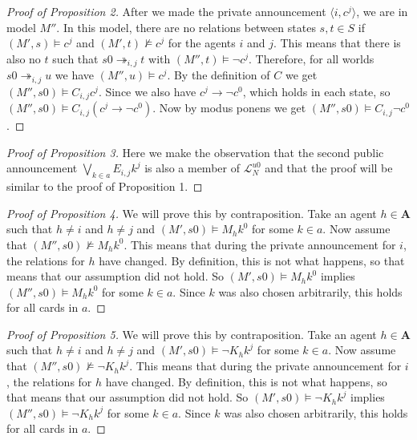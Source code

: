 \documentclass[a4paper, 10pt]{article}
\newcommand{\impl}{\rightarrow}
\newcommand{\A}{\mathbf{A}}
\begin{document}
\begin{proof}[Proof of Proposition 2]
    After we made the private announcement $\langle i, c^j\rangle$, we are
    in model $M''$. In this model, there are no relations between states
    $s, t \in S$ if $(M', s) \models c^j$ and $(M', t) \not \models c^j$
    for the agents $i$ and $j$. This means that there is also no $t$ such
    that $s0 \twoheadrightarrow_{i,j} t$ with $(M'', t) \models \neg c^j$.
    Therefore, for all worlds $s0 \twoheadrightarrow_{i,j} u$ we have
    $(M'', u) \models c^j$. By the definition of $C$ we get $(M'', s0)
    \models C_{i,j} c^j$. Since we also have $c^j \impl \neg c^0$, which
    holds in each state, so $(M'', s0) \models C_{i,j} (c^j \impl \neg
    c^0)$. Now by modus ponens we get $(M'', s0) \models C_{i,j} \neg c^0$.
\end{proof}

\begin{proof}[Proof of Proposition 3]
    Here we make the observation that the second public announcement
    $\bigvee_{k\in a} E_{i,j} k^j$ is also a member of
    $\mathcal{L}_N^{u0}$ and that the proof will be similar to the proof of
    Proposition 1.
\end{proof}

\begin{proof}[Proof of Proposition 4]
    We will prove this by contraposition.
    Take an agent $h \in \A$ such that $h \not = i$ and $h \not = j$ and
    $(M', s0) \models M_h k^0$ for some $k \in a$. Now assume that $(M'',
    s0) \not \models M_h k^0$. This means that during the private
    announcement for $i$, the relations for $h$ have changed. By
    definition, this is not what happens, so that means that our assumption
    did not hold. So $(M', s0) \models M_h k^0$ implies $(M'', s0) \models
    M_h k^0$ for some $k \in a$. Since $k$ was also chosen arbitrarily,
    this holds for all cards in $a$. 
\end{proof}

\begin{proof}[Proof of Proposition 5]
    We will prove this by contraposition.
    Take an agent $h \in \A$ such that $h \not = i$ and $h \not = j$ and
    $(M', s0) \models \neg K_h k^j$ for some $k \in a$. Now assume that
    $(M'', s0) \not \models \neg K_h k^j$. This means that during the private
    announcement for $i$, the relations for $h$ have changed. By
    definition, this is not what happens, so that means that our assumption
    did not hold. So $(M', s0) \models \neg K_h k^j$ implies $(M'', s0) \models
    \neg K_h k^j$ for some $k \in a$. Since $k$ was also chosen arbitrarily,
    this holds for all cards in $a$. 
\end{proof}



\end{document}
